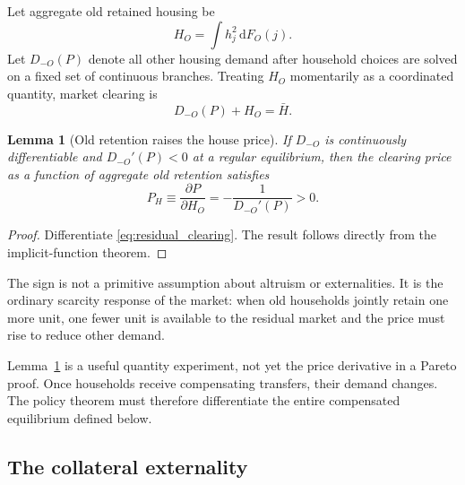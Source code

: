 \documentclass[11pt]{article}
\newtheorem{lemma}{Lemma}
\newcommand{\dd}{\mathrm d}
\newcommand{\1}{\mathbf 1}
\begin{document}
Let aggregate old retained housing be
\begin{equation}
H_O=\int h_j^2\,\dd F_O(j).
\end{equation}
Let $D_{-O}(P)$ denote all other housing demand after household choices are
solved on a fixed set of continuous branches. Treating $H_O$ momentarily as a
coordinated quantity, market clearing is
\begin{equation}
D_{-O}(P)+H_O=\bar H.
\label{eq:residual_clearing}
\end{equation}

\begin{lemma}[Old retention raises the house price]
\label{lem:price}
If $D_{-O}$ is continuously differentiable and $D_{-O}'(P)<0$ at a regular
equilibrium, then the clearing price as a function of aggregate old retention
satisfies
\begin{equation}
P_H\equiv\frac{\partial P}{\partial H_O}
=-\frac{1}{D_{-O}'(P)}>0.
\label{eq:PH}
\end{equation}
\end{lemma}

\begin{proof}
Differentiate \eqref{eq:residual_clearing}. The result follows directly from
the implicit-function theorem.
\end{proof}

The sign is not a primitive assumption about altruism or externalities. It is
the ordinary scarcity response of the market: when old households jointly
retain one more unit, one fewer unit is available to the residual market and
the price must rise to reduce other demand.

Lemma~\ref{lem:price} is a useful quantity experiment, not yet the price
derivative in a Pareto proof. Once households receive compensating transfers,
their demand changes. The policy theorem must therefore differentiate the
entire compensated equilibrium defined below.

\subsection{The collateral externality}
\end{document}
